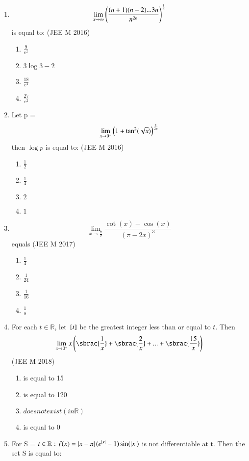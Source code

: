 \documentclass[journal,12pt,twocolumn]{IEEEtran}
\theoremstyle{remark}
\begin{document}
\begin{enumerate}
\item \[\lim_{x\to\infty} \left(\frac{(n+1)(n+2)...3n}{n^{2n}}\right)^{\frac{1}{n}} \] is equal to:
	\hfill{(JEE M 2016)}
	\begin{enumerate}[label=(\alph*)]
		\item $\frac{9}{e^2}$
		\item $3\log 3 - 2$
		\item $\frac{18}{e^4}$
		\item $\frac{27}{e^2}$
	\end{enumerate}
\item Let p = \[\lim_{x\to0^+} \left(1+\tan^2(\sqrt{x})\right)^{\frac{1}{2x}} \] then $\log p$ is equal to:
	\hfill{(JEE M 2016)}
	\begin{enumerate}[label=(\alph*)]
		\item $\frac{1}{2}$
		\item $\frac{1}{4}$
		\item $2$
		\item $1$
	\end{enumerate}
\item \[\lim_{x\to\frac{\pi}{2}} \frac{\cot(x)-\cos(x)}{(\pi -2x)^3} \] equals 
	\hfill{(JEE M 2017)}
	\begin{enumerate}[label=(\alph*)]
		\item $\frac{1}{4}$
		\item $\frac{1}{24}$
		\item $\frac{1}{16}$
		\item $\frac{1}{8}$
	\end{enumerate}
\item For each $t\in\mathbb{R}$, let ${}\left[t\right]$ be the greatest integer less than or equal to $t$. Then 
	\[\lim_{x\to0^+} x\brak{ \sbrac{\frac{1}{x}}+\sbrac{\frac{2}{x}}+...+\sbrac{ \frac{15}{x}}} \]
	\hfill{(JEE M 2018)}
	\begin{enumerate}[label=(\alph*)]
		\item is equal to 15
		\item is equal to 120
		\item $does not exist(in \mathbb{R})$
		\item is equal to 0
	\end{enumerate}
\item For S =  $t\in\mathbb{R}:f(x)=\left\vert x-\pi\right\vert(e^{\left\vert x\right\vert}-1)\sin(\left\vert x\right\vert)$ is not differentiable at t. Then the set S is equal to:


\end{enumerate}
\end{document}
